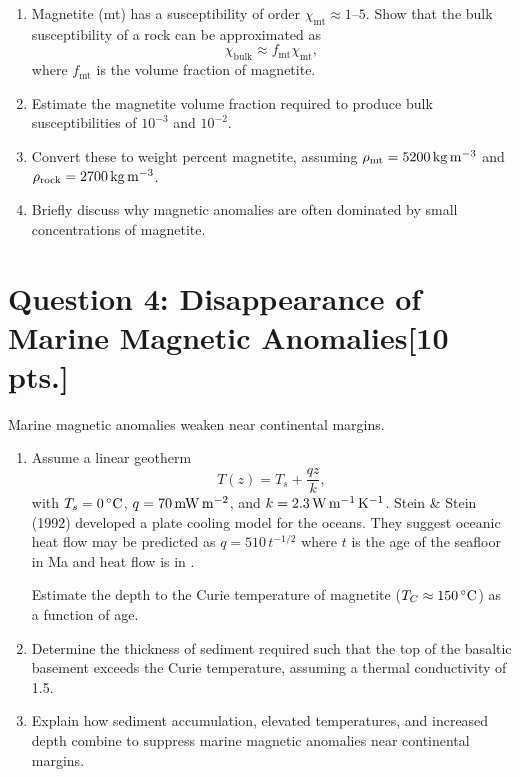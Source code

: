 \documentclass[11pt,a4paper]{article}
\begin{document}
\begin{enumerate}[itemsep=-0.5em]
    \item Magnetite (mt) has a susceptibility of order $\chi_{\text{mt}}\approx1$--$5$.  Show that the bulk susceptibility of a rock can be approximated as
    \[
        \chi_{\text{bulk}} \approx f_{\text{mt}}\chi_{\text{mt}},
    \]
    where $f_{\text{mt}}$ is the volume fraction of magnetite.

    \item Estimate the magnetite volume fraction required to produce bulk susceptibilities of $10^{-3}$ and $10^{-2}$.

    \item Convert these to weight percent magnetite, assuming
    $\rho_{\text{mt}} = \SI{5200}{\du}$ and
    $\rho_{\text{rock}}= \SI{2700}{\du}$.

    \item Briefly discuss why magnetic anomalies are often dominated by small concentrations of magnetite.
\end{enumerate}


\section*{Question 4: Disappearance of Marine Magnetic Anomalies\hfill [10 pts.]}

Marine magnetic anomalies weaken near continental margins.

\begin{enumerate}[itemsep=-0.5em]
  \item Assume a linear geotherm
  \[
  T(z) = T_s + \frac{qz}{k},
  \]
  with $T_s = \SI{0}{\degC}$, $q = \SI{70}{\hfu}$, and $k = \SI{2.3}{\tcu}$. Stein \& Stein (1992) developed a plate cooling model for the oceans.  They suggest oceanic heat flow may be predicted as $q = 510\,t^{-1/2}$ where $t$ is the age of the seafloor in \si{Ma} and heat flow is in \si{\hfu}.

  Estimate the depth to the Curie temperature of magnetite
  ($T_C \approx \SI{150}{\degC}$) as a function of age.

  \item Determine the thickness of sediment required such that the top of the basaltic basement exceeds the Curie temperature, assuming a thermal conductivity of \SI{1.5}{\tcu}.

  \item Explain how sediment accumulation, elevated temperatures, and increased depth combine to suppress marine magnetic anomalies near continental margins.
\end{enumerate}
\end{document}
